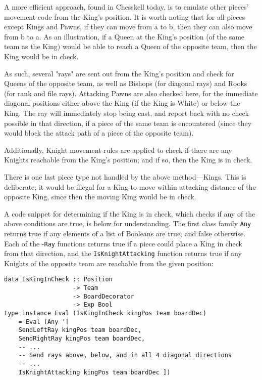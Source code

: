 \documentclass[12pt, a4paper, bibliography=totocnumbered]{scrreprt}
\newcommand{\inline}[1]{\lstinline[basicstyle=\ttfamily\footnotesize]{#1}}
\begin{document}
A more efficient approach, found in Chesskell today, is to emulate other pieces' movement code from the King's position. It is worth noting that for all pieces except Kings and Pawns, if they can move from a to b, then they can also move from b to a. As an illustration, if a Queen at the King's position (of the same team as the King) would be able to reach a Queen of the opposite team, then the King would be in check.

As such, several "rays" are sent out from the King's position and check for Queens of the opposite team, as well as Bishops (for diagonal rays) and Rooks (for rank and file rays). Attacking Pawns are also checked here, for the immediate diagonal positions either above the King (if the King is White) or below the King. The ray will immediately stop being cast, and report back with no check possible in that direction, if a piece of the same team is encountered (since they would block the attack path of a piece of the opposite team).

Additionally, Knight movement rules are applied to check if there are any Knights reachable from the King's position; and if so, then the King is in check.

There is one last piece type not handled by the above method---Kings. This is deliberate; it would be illegal for a King to move within attacking distance of the opposite King, since then the moving King would be in check.

A code snippet for determining if the King is in check, which checks if any of the above conditions are true, is below for understanding. The first class family \inline{Any} returns true if any elements of a list of Booleans are true, and false otherwise. Each of the -\inline{Ray} functions returns true if a piece could place a King in check from that direction, and the \inline{IsKnightAttacking} function returns true if any Knights of the opposite team are reachable from the given position:

\begin{lstlisting}
data IsKingInCheck :: Position
                   -> Team
                   -> BoardDecorator
                   -> Exp Bool
type instance Eval (IsKingInCheck kingPos team boardDec)
    = Eval (Any '[
    SendLeftRay kingPos team boardDec,
    SendRightRay kingPos team boardDec,
    -- ...
    -- Send rays above, below, and in all 4 diagonal directions
    -- ...
    IsKnightAttacking kingPos team boardDec ])
\end{lstlisting}
\end{document}

